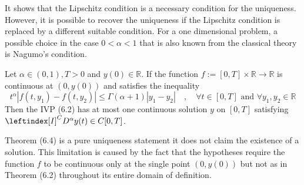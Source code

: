 It shows that the Lipschitz condition is a necessary condition for the uniqueness.
However, it is possible to recover the uniqueness if the Lipschitz condition is replaced
by a different suitable condition. For a one dimensional problem, a possible
choice in the case $0 < \alpha < 1$ that is also known from the classical theory is Nagumo's condition.
\begin{theorem}
    Let $\alpha \in (0, 1), T > 0$ and $y(0) \in \mathbb{R}$. If the function 
    $f := [0, T] \times \mathbb{R} \to \mathbb{R}$ is continuous at $(0, y(0))$ and satisfies the inequality
    \[
        t^\alpha |f(t,y_1)-f(t,y_2)| \leq \Gamma(\alpha+1)|y_1-y_2| \quad,\quad \forall t \in [0,T] \text{ and } \forall y_1,y_2 \in \mathbb{R}
    \]
    Then the IVP (6.2) has at most one continuous solution $y$ on $[0, T]$ satisfying $ \leftindex[I]^C {D^{\alpha}} y(t) \in C[0, T]$.
\end{theorem}
Theorem (6.4) is a pure uniqueness statement it does not claim the existence of a solution.
This limitation is caused by the fact that the hypotheses require the function $f$ to be continuous 
only at the single point $(0, y(0))$ but not as in Theorem (6.2) throughout its entire domain of definition.

